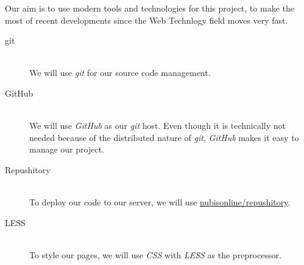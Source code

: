Our aim is to use modern tools and technologies for this project, to make the most of recent developments since the Web Technlogy field moves very fast.

\begin{description}
	\item[git]\hfill\\
		We will use \textit{git} for our source code management.
		
	\item[GitHub]\hfill\\
		We will use \textit{GitHub} as our \textit{git} host. Even though it is technically not needed because of the distributed nature of \textit{git}, \textit{GitHub} makes it easy to manage our project.
	
	\item[Repushitory]\hfill\\
		To deploy our code to our server, we will use \href{https://github.com/nubisonline/repushitory}{nubisonline/repushitory}.

	\item[LESS]\hfill\\
		To style our pages, we will use \textit{CSS} with \textit{LESS} as the preprocessor.
\end{description}
